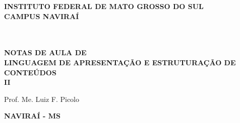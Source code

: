 \thispagestyle{empty}

\vfill
 \begin{center}
    
    {\large\bfseries INSTITUTO FEDERAL DE MATO GROSSO DO SUL} \\
    
    {\large\bfseries CAMPUS NAVIRAÍ}  \\ 

    \vspace*{1in}
    \begin{large} \end{large}\\[0.4in]

    \vspace*{4cm}
    \noindent \\
    
    \large\bfseries{NOTAS DE AULA DE} \\
    \huge\bfseries{LINGUAGEM DE APRESENTAÇÃO E ESTRUTURAÇÃO DE CONTEÚDOS} \\ II
    
    \vspace*{4cm}
    
    \large{Prof. Me. Luiz F. Picolo}
    
    \vfill
    \large\bfseries{NAVIRAÍ - MS}
\end{center}

\normalsize


